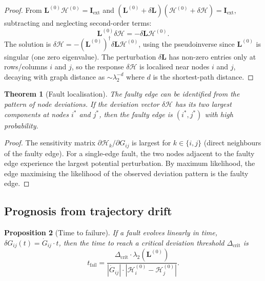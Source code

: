 \documentclass[twocolumn,10pt,a4paper]{article}
\newtheorem{theorem}{Theorem}[section]
\newtheorem{proposition}[theorem]{Proposition}
\theoremstyle{definition}
\theoremstyle{remark}
\newcommand{\Hcal}{\mathcal{H}}
\newcommand{\vect}[1]{\boldsymbol{#1}}
\newcommand{\mat}[1]{\mathbf{#1}}
\begin{document}
\begin{proof}
From $\mat{L}^{(0)} \vect{\Hcal}^{(0)} = \vect{I}_{\mathrm{ext}}$ and $(\mat{L}^{(0)} + \delta\mat{L})(\vect{\Hcal}^{(0)} + \delta\vect{\Hcal}) = \vect{I}_{\mathrm{ext}}$, subtracting and neglecting second-order terms:
\begin{equation}
    \mat{L}^{(0)} \delta\vect{\Hcal} = -\delta\mat{L} \vect{\Hcal}^{(0)}.
\end{equation}
The solution is $\delta\vect{\Hcal} = -(\mat{L}^{(0)})^\dagger \delta\mat{L} \vect{\Hcal}^{(0)}$, using the pseudoinverse since $\mat{L}^{(0)}$ is singular (one zero eigenvalue). The perturbation $\delta\mat{L}$ has non-zero entries only at rows/columns $i$ and $j$, so the response $\delta\vect{\Hcal}$ is localised near nodes $i$ and $j$, decaying with graph distance as $\sim \lambda_2^{-d}$ where $d$ is the shortest-path distance.
\end{proof}

\begin{theorem}[Fault localisation]\label{thm:fault_local}
The faulty edge can be identified from the pattern of node deviations. If the deviation vector $\delta\vect{\Hcal}$ has its two largest components at nodes $i^*$ and $j^*$, then the faulty edge is $(i^*, j^*)$ with high probability.
\end{theorem}

\begin{proof}
The sensitivity matrix $\partial \Hcal_k / \partial G_{ij}$ is largest for $k \in \{i, j\}$ (direct neighbours of the faulty edge). For a single-edge fault, the two nodes adjacent to the faulty edge experience the largest potential perturbation. By maximum likelihood, the edge maximising the likelihood of the observed deviation pattern is the faulty edge.
\end{proof}

\subsection{Prognosis from trajectory drift}

\begin{proposition}[Time to failure]\label{prop:ttf}
If a fault evolves linearly in time, $\delta G_{ij}(t) = \dot{G}_{ij} \cdot t$, then the time to reach a critical deviation threshold $\Delta_{\mathrm{crit}}$ is
\begin{equation}\label{eq:ttf}
    t_{\mathrm{fail}} = \frac{\Delta_{\mathrm{crit}} \cdot \lambda_2(\mat{L}^{(0)})}{|\dot{G}_{ij}| \cdot |\Hcal_i^{(0)} - \Hcal_j^{(0)}|}.
\end{equation}
\end{proposition}
\end{document}
